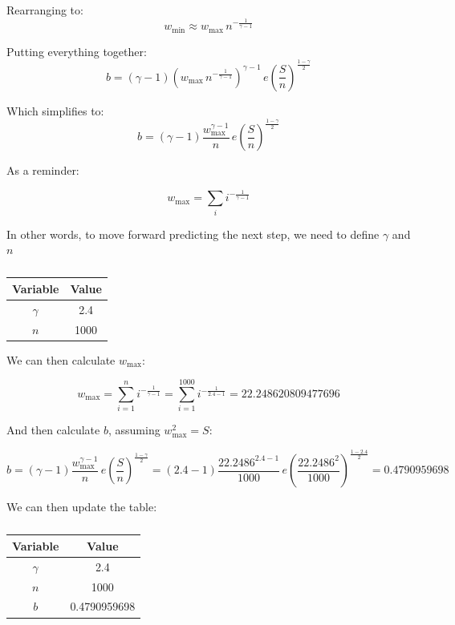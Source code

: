 \documentclass[12pt, a4paper]{article}   %
\begin{document}
Rearranging to:
\[
    w_{\text{min}} \approx w_{\text{max}}\, n^{-\frac{1}{\gamma - 1}}
\]


Putting everything together:
\[
    b = (\gamma - 1) \left ( w_{\text{max}}\, n^{-\frac{1}{\gamma - 1}} \right )^{\gamma - 1}\, e \left (\frac{S}{n} \right ) ^{\frac{1-\gamma}{2}}
\]

Which simplifies to:
\begin{equation} \label{eq:b-simplified}
    b = (\gamma - 1)  \frac{w_{\text{max}}^{\gamma - 1}}{n} \, e \left (\frac{S}{n} \right ) ^{\frac{1-\gamma}{2}}
\end{equation}

As a reminder:

\[
w_{\text{max}} = \sum_{i}{i^{ -\frac{1}{\gamma-1}}}
\]




In other words, to move forward predicting the next step, we need to define \( \gamma \) and \( n \)



\begin{table}[H]
\centering
\label{tab:params-initial}
\begin{tabular}{c c}
\toprule
{Variable} & {Value}  \\
\midrule
\( \gamma \) & 2.4 \\
\( n \) & 1000 \\
\bottomrule
\end{tabular}
\caption{}
\end{table}

We can then calculate \( w_{\text{max}} \):

\[
w_{\text{max}} = \sum_{i=1}^{n}{i^{ -\frac{1}{\gamma-1}}} = \sum_{i=1}^{1000}{i^{ -\frac{1}{2.4-1}}} = 22.248620809477696
\]

And then calculate \( b \), assuming \( w_{\text{max}}^2 = S \):

\[
 b = (\gamma - 1)  \frac{w_{\text{max}}^{\gamma - 1}}{n} \, e \left (\frac{S}{n} \right ) ^{\frac{1-\gamma}{2}} = (2.4 - 1)  \frac{22.2486^{2.4 - 1}}{1000} \, e \left (\frac{22.2486^2}{1000} \right ) ^{\frac{1-2.4}{2}} = 0.4790959698
\]

We can then update the table:

\begin{table}[H]
\centering
\label{tab:params-updated}
\begin{tabular}{c c}
\toprule
{Variable} & {Value}  \\
\midrule
\( \gamma \) & 2.4 \\
\( n \) & 1000 \\
\( b \) & 0.4790959698 \\
\bottomrule
\end{tabular}
\caption{}
\end{table}
\end{document}
